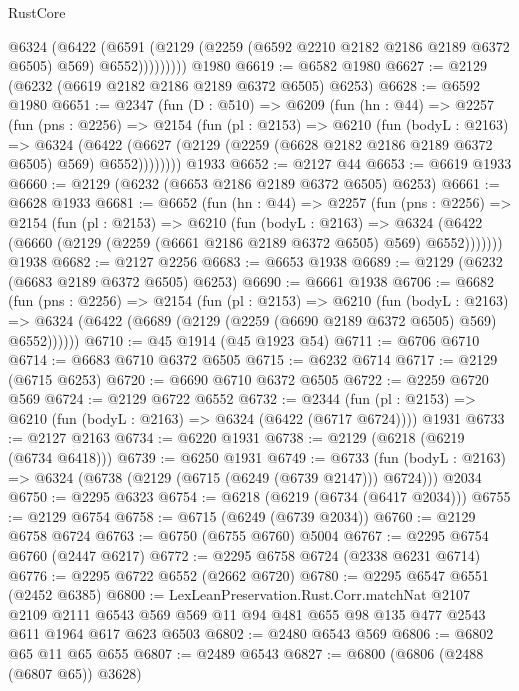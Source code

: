 \begin{lexlean}{RustCore}
\begin{coremodule}
              @6324
                (@6422
                  (@6591
                    (@2129 (@2259 (@6592 @2210 @2182 @2186 @2189 @6372 @6505) @569) @6552)))))))))
    @1980
@6619 := @6582 @1980
@6627 := @2129 (@6232 (@6619 @2182 @2186 @2189 @6372 @6505) @6253)
@6628 := @6592 @1980
@6651 := @2347
    (fun (D : @510) =>
    @6209
      (fun (hn : @44) =>
      @2257
        (fun (pns : @2256) =>
        @2154
          (fun (pl : @2153) =>
          @6210
            (fun (bodyL : @2163) =>
            @6324
              (@6422 (@6627 (@2129 (@2259 (@6628 @2182 @2186 @2189 @6372 @6505) @569) @6552))))))))
    @1933
@6652 := @2127 @44
@6653 := @6619 @1933
@6660 := @2129 (@6232 (@6653 @2186 @2189 @6372 @6505) @6253)
@6661 := @6628 @1933
@6681 := @6652
    (fun (hn : @44) =>
    @2257
      (fun (pns : @2256) =>
      @2154
        (fun (pl : @2153) =>
        @6210
          (fun (bodyL : @2163) =>
          @6324 (@6422 (@6660 (@2129 (@2259 (@6661 @2186 @2189 @6372 @6505) @569) @6552)))))))
    @1938
@6682 := @2127 @2256
@6683 := @6653 @1938
@6689 := @2129 (@6232 (@6683 @2189 @6372 @6505) @6253)
@6690 := @6661 @1938
@6706 := @6682
    (fun (pns : @2256) =>
    @2154
      (fun (pl : @2153) =>
      @6210
        (fun (bodyL : @2163) =>
        @6324 (@6422 (@6689 (@2129 (@2259 (@6690 @2189 @6372 @6505) @569) @6552))))))
@6710 := @45 @1914 (@45 @1923 @54)
@6711 := @6706 @6710
@6714 := @6683 @6710 @6372 @6505
@6715 := @6232 @6714
@6717 := @2129 (@6715 @6253)
@6720 := @6690 @6710 @6372 @6505
@6722 := @2259 @6720 @569
@6724 := @2129 @6722 @6552
@6732 := @2344
    (fun (pl : @2153) => @6210 (fun (bodyL : @2163) => @6324 (@6422 (@6717 @6724))))
    @1931
@6733 := @2127 @2163
@6734 := @6220 @1931
@6738 := @2129 (@6218 (@6219 (@6734 @6418)))
@6739 := @6250 @1931
@6749 := @6733
    (fun (bodyL : @2163) => @6324 (@6738 (@2129 (@6715 (@6249 (@6739 @2147))) @6724)))
    @2034
@6750 := @2295 @6323
@6754 := @6218 (@6219 (@6734 (@6417 @2034)))
@6755 := @2129 @6754
@6758 := @6715 (@6249 (@6739 @2034))
@6760 := @2129 @6758 @6724
@6763 := @6750 (@6755 @6760) @5004
@6767 := @2295 @6754 @6760 (@2447 @6217)
@6772 := @2295 @6758 @6724 (@2338 @6231 @6714)
@6776 := @2295 @6722 @6552 (@2662 @6720)
@6780 := @2295 @6547 @6551 (@2452 @6385)
@6800 := LexLeanPreservation.Rust.Corr.matchNat
    @2107
    @2109
    @2111
    @6543
    @569
    @569
    @11
    @94
    @481
    @655
    @98
    @135
    @477
    @2543
    @611
    @1964
    @617
    @623
    @6503
@6802 := @2480 @6543 @569
@6806 := @6802 @65 @11 @65 @655
@6807 := @2489 @6543
@6827 := @6800
    (@6806 (@2488 (@6807 @65)) @3628)

\end{coremodule}
\end{lexlean}
